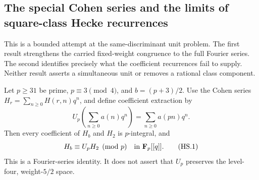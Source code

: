 \subsection{The special Cohen series and the limits of square-class Hecke recurrences}

This is a bounded attempt at the same-discriminant unit problem.
The first result strengthens the carried fixed-weight congruence to
the full Fourier series.  The second identifies precisely what the
coefficient recurrences fail to supply.  Neither result asserts a
simultaneous unit or removes a rational class component.

\begin{proposition}
Let $p\geq31$ be prime, $p\equiv3\pmod4$, and $b=(p+3)/2$.
Use the Cohen series
$H_r=\sum_{n\geq0}H(r,n)q^n$, and define coefficient extraction by
\[
 U_p\!\left(\sum_{n\geq0}a(n)q^n\right)
                  =\sum_{n\geq0}a(pn)q^n.
\]
Then every coefficient of $H_b$ and $H_2$ is $p$-integral, and
\[
                           H_b\equiv U_p H_2\pmod p
                  \quad\hbox{in }\mathbf F_p[[q]].       \tag{HS.1}
\]
This is a Fourier-series identity.  It does not assert that $U_p$
preserves the level-four, weight-$5/2$ space.
\end{proposition}

